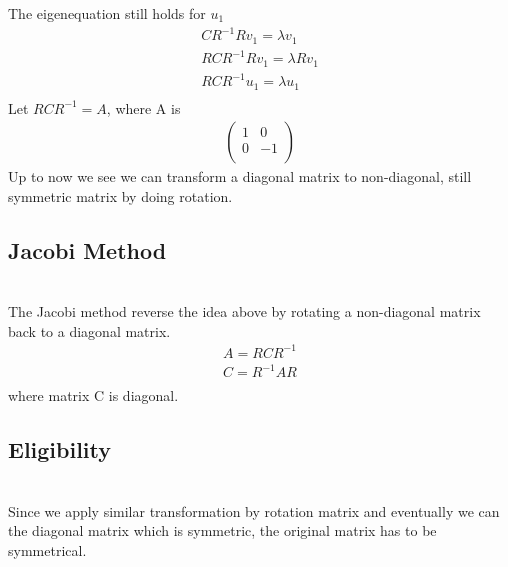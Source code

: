 \documentclass[a4paper]{article}
\begin{document}
The eigenequation still holds for $u_1$
\begin{align*}
	C R^{-1} R v_1 = \lambda v_1 \\
	R C R^{-1} R v_1 = \lambda R v_1 \\
	R C R^{-1} u_1 = \lambda  u_1 \\
\end{align*}
Let $R C R^{-1} = A $, where A is
\begin{align*}
	\left( \begin{array}{cc}	
		1 & 0\\
		0 & -1\\
\end{array} \right)
\end{align*}
Up to now we see we can transform a diagonal matrix to non-diagonal, still symmetric matrix by doing rotation. \\
\subsection{Jacobi Method}\\
The Jacobi method reverse the idea above by rotating a non-diagonal matrix back to a diagonal matrix. 
\begin{align*}
	A = R C R^{-1} \\
	C = R^{-1} A R \\
\end{align*}
where matrix C is diagonal.\\
\subsection{Eligibility}\\
Since we apply similar transformation by rotation matrix and eventually we can the diagonal matrix which is symmetric, the original matrix has to be symmetrical.\\
\end{document}
